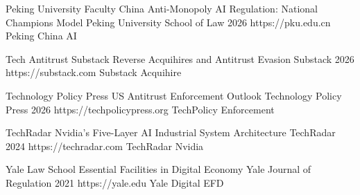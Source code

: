   {Peking University Faculty}
  {China Anti-Monopoly AI Regulation: National Champions Model}
  {Peking University School of Law}
  {2026}
  {https://pku.edu.cn}
  {Peking China AI}

  {Tech Antitrust Substack}
  {Reverse Acquihires and Antitrust Evasion}
  {Substack}
  {2026}
  {https://substack.com}
  {Substack Acquihire}

  {Technology Policy Press}
  {US Antitrust Enforcement Outlook}
  {Technology Policy Press}
  {2026}
  {https://techpolicypress.org}
  {TechPolicy Enforcement}

  {TechRadar}
  {Nvidia's Five-Layer AI Industrial System Architecture}
  {TechRadar}
  {2024}
  {https://techradar.com}
  {TechRadar Nvidia}

  {Yale Law School}
  {Essential Facilities in Digital Economy}
  {Yale Journal of Regulation}
  {2021}
  {https://yale.edu}
  {Yale Digital EFD}
